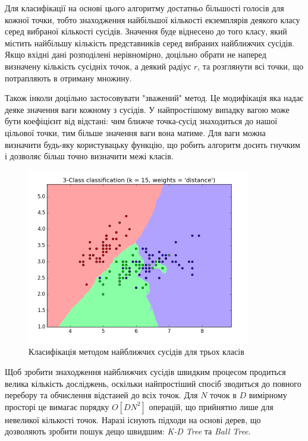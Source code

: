 Для класифікації на основі цього алгоритму достатньо більшості голосів для кожної точки, тобто знаходження найбільшої кількості екземплярів деякого класу серед вибраної кількості сусідів. Значення буде віднесено до того класу, який містить найбільшу кількість представників серед вибраних найближчих сусідів. Якщо вхідні дані 
розподілені нерівномірно, доцільно обрати не наперед визначену кількість сусідніх точок, а деякий радіус $r$, та розглянути всі точки, що потрапляють в отриману множину.

Також інколи доцільно застосовувати "зважений" метод. Це модифікація яка надає деяке значення ваги кожному з сусідів. У найпростішому випадку вагою може бути коефіцієнт від відстані: чим ближче точка-сусід знаходиться до нашої цільової точки, тим більше значення ваги вона матиме. Для ваги можна визначити будь-яку користувацьку функцію, що робить алгоритм досить гнучким і дозволяє більш точно визначити межі класів.

\begin{figure}[h!]
  \includegraphics[width=\linewidth]{figures/knn.png}
  \caption{Класифікація методом найближчих сусідів для трьох класів}
  \label{fig:knn}
\end{figure}

Щоб зробити знаходження найближчих сусідів швидким процесом продиться велика кількість досліджень, оскільки найпростіший спосіб зводиться до повного перебору та обчислення відстаней до всіх точок. Для $N$ точок в $D$ вимірному просторі це вимагає порядку $O[DN^2]$ операцій, що прийнятно лише для невеликої кількості точок. Наразі існують підходи на основі дерев, що дозволяють зробити пошук дещо швидшим: \textit{K-D Tree} та \textit{Ball Tree}.

